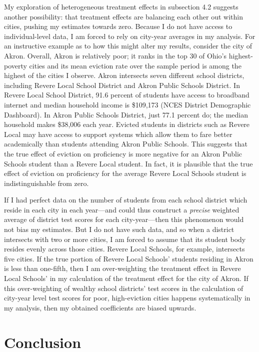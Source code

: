\documentclass[12pt]{article}
\begin{document}
My exploration of heterogeneous treatment effects in subsection 4.2 suggests another possibility: that treatment effects are balancing each other out within cities, pushing my estimates towards zero. Because I do not have access to individual-level data, I am forced to rely on city-year averages in my analysis. For an instructive example as to how this might alter my results, consider the city of Akron. Overall, Akron is relatively poor; it ranks in the top 30 of Ohio's highest-poverty cities and its mean eviction rate over the sample period is among the highest of the cities I observe. Akron intersects seven different school districts, including Revere Local School District and Akron Public Schools District. In Revere Local School District, 91.6 percent of students have access to broadband internet and median household income is \$109,173 (NCES District Demographic Dashboard). In Akron Public Schools District, just 77.1 percent do; the median household makes \$38,006 each year. Evicted students in districts such as Revere Local may have access to support systems which allow them to fare better academically than students attending Akron Public Schools. This suggests that the true effect of eviction on proficiency is more negative for an Akron Public Schools student than a Revere Local student. In fact, it is plausible that the true effect of eviction on proficiency for the average Revere Local Schools student is indistinguishable from zero. 

If I had perfect data on the number of students from each school district which reside in each city in each year—and could thus construct a \textit{precise} weighted average of district test scores for each city-year—then this phenomenon would not bias my estimates. But I do not have such data, and so when a district intersects with two or more cities, I am forced to assume that its student body resides evenly across those cities. Revere Local Schools, for example, intersects five cities. If the true portion of Revere Local Schools' students residing in Akron is less than one-fifth, then I am over-weighting the treatment effect in Revere Local Schools' in my calculation of the treatment effect for the city of Akron. If this over-weighting of wealthy school districts' test scores in the calculation of city-year level test scores for poor, high-eviction cities happens systematically in my analysis, then my obtained coefficients are biased upwards.


\section{Conclusion} \label{sec:conclusion}
\end{document}
